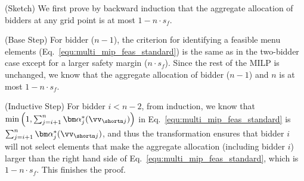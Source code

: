 (Sketch) We first prove 
 by backward induction
 that the aggregate allocation of bidders at any grid point
is at most $1-n\cdot s_f$.

(Base Step) For bidder ($n-1$), the criterion for identifying  a feasible menu elements (Eq.~\ref{equ:multi_mip_feas_standard}) is the same as in the two-bidder case except for a larger safety margin ($n\cdot s_f$). Since the rest of the MILP is unchanged,
 we know that the aggregate allocation of bidder ($n-1$) and $n$ is at most $1-n\cdot s_f$.

(Inductive Step) For bidder $i<n-2$, from induction, we know that $\min\left(1, \sum_{j=i+1}^n\bm\alpha^*_{j}(\vv_{\shortn j}) \right)$ in Eq.~\ref{equ:multi_mip_feas_standard} is $\sum_{j=i+1}^n\bm\alpha^*_{j}(\vv_{\shortn j})$, and thus the transformation ensures that bidder $i$ will not select elements that make the aggregate allocation (including bidder $i$) larger than the right hand side of Eq.~\ref{equ:multi_mip_feas_standard}, which is $1-n\cdot s_f$. This finishes the proof.